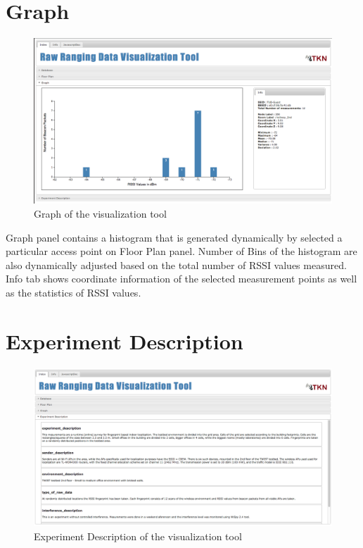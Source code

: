 \documentclass[11pt,a4paper,headinclude,footinclude,chapterprefix=on]{scrreprt}
\begin{document}
\section{Graph} 
\begin{figure}
	[!] \centering 
	\includegraphics[width=15cm]{Images/tool_graph.png} \caption{Graph of the visualization tool} \label{fig:tool:graph} 
\end{figure}
Graph panel contains a histogram that is generated dynamically by selected a particular access point on Floor Plan panel. Number of Bins of the histogram are also dynamically adjusted based on the total number of RSSI values measured. Info tab shows coordinate information of the selected measurement points as well as the statistics of RSSI values.

\section{Experiment Description} 
\begin{figure}
	[!] \centering 
	\includegraphics[width=15cm]{Images/tool_des.png} \caption{Experiment Description of the visualization tool} \label{fig:tool:des} 
\end{figure}
\end{document}
